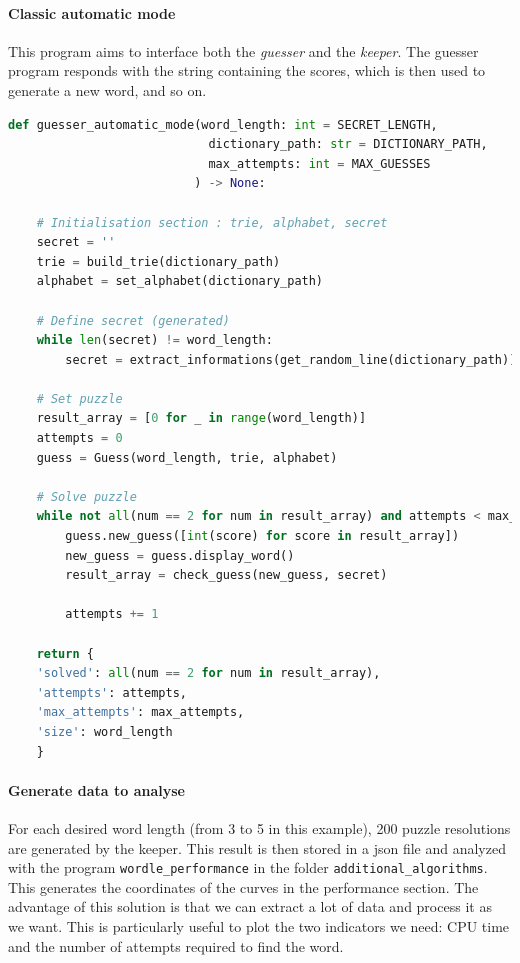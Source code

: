\documentclass[10pt,a4paper,hidelinks]{article}
\begin{document}
\paragraph{Classic automatic mode}
This program aims to interface both the \textit{guesser} and the \textit{keeper}. The guesser program responds with the string containing the scores, which is then used to generate a new word, and so on.
\begin{lstlisting}[language=Python]
def guesser_automatic_mode(word_length: int = SECRET_LENGTH,
                            dictionary_path: str = DICTIONARY_PATH,
                            max_attempts: int = MAX_GUESSES
                          ) -> None:

    # Initialisation section : trie, alphabet, secret
    secret = ''
    trie = build_trie(dictionary_path)
    alphabet = set_alphabet(dictionary_path)

    # Define secret (generated)
    while len(secret) != word_length:
        secret = extract_informations(get_random_line(dictionary_path))

    # Set puzzle
    result_array = [0 for _ in range(word_length)]
    attempts = 0
    guess = Guess(word_length, trie, alphabet)

    # Solve puzzle
    while not all(num == 2 for num in result_array) and attempts < max_attempts:
        guess.new_guess([int(score) for score in result_array])
        new_guess = guess.display_word()
        result_array = check_guess(new_guess, secret)

        attempts += 1

    return {
    'solved': all(num == 2 for num in result_array),
    'attempts': attempts,
    'max_attempts': max_attempts,
    'size': word_length
    }

\end{lstlisting}

\paragraph{Generate data to analyse}
For each desired word length (from 3 to 5 in this example), 200 puzzle resolutions are generated by the keeper. This result is then stored in a json file and analyzed with the program \verb|wordle_performance| in the folder \verb|additional_algorithms|. This generates the coordinates of the curves in the performance section. 
The advantage of this solution is that we can extract a lot of data and process it as we want. This is particularly useful to plot the two indicators we need: CPU time and the number of attempts required to find the word.
\end{document}
